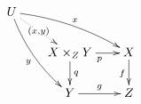 \documentclass[10pt]{book}
\begin{document}
\begin{mdSnippets}
\begin{mdDisplaySnippet}[8e0dd4b39ca7a6e08378a6bdf2689841]
\end{mdDisplaySnippet}
\begin{mdDisplaySnippet}[d10e8eb990fe5cd7257fd28b4d3b7d75]%
\begin{mdDiv}[class={math,math-display},color={},math-needpdf={}]%
\[%
\xymatrix @-0.5em{
U \ar@/_/[ddr]_y \ar@/^/[drr]^x
\ar@{.>}[dr]|-{(x,y)} \\
& X \times_Z Y \ar[d]^q \ar[r]_p
& X \ar[d]_f \\
& Y \ar[r]^g & Z }\]%
\end{mdDiv}%

\end{mdDisplaySnippet}
\newcommand{\infer}[3]{#1 \vdash #2\,:#3}


\end{mdSnippets}
\end{document}
